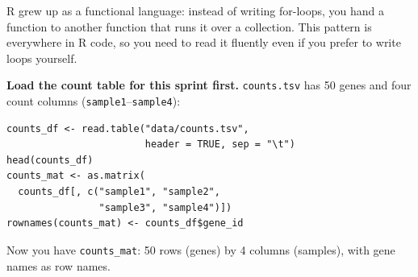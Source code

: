 R grew up as a functional language: instead of writing for-loops, you hand a function to another function that runs it over a collection. This pattern is everywhere in R code, so you need to read it fluently even if you prefer to write loops yourself.

\textbf{Load the count table for this sprint first.} \texttt{counts.tsv} has 50 genes and four count columns (\texttt{sample1}--\texttt{sample4}):
\begin{lstlisting}
counts_df <- read.table("data/counts.tsv",
                        header = TRUE, sep = "\t")
head(counts_df)
counts_mat <- as.matrix(
  counts_df[, c("sample1", "sample2",
                "sample3", "sample4")])
rownames(counts_mat) <- counts_df$gene_id
\end{lstlisting}
Now you have \texttt{counts\_mat}: 50 rows (genes) by 4 columns (samples), with gene names as row names.

